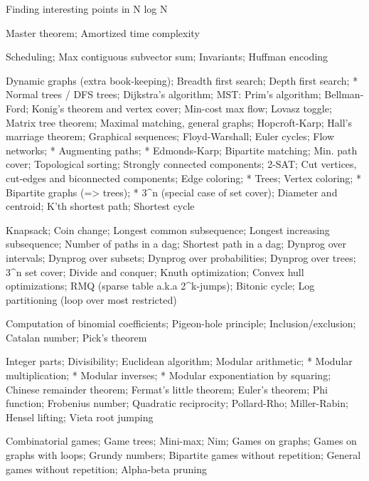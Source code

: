 \begin{multicols}{\Columns}
 \par
{} Finding interesting points in N log N\par
{} Master theorem; Amortized time complexity\par
{} Scheduling; Max contiguous subvector sum; Invariants; Huffman encoding\par
{} Dynamic graphs (extra book-keeping); Breadth first search; Depth first search; * Normal trees / DFS trees; Dijkstra's algorithm; MST: Prim's algorithm; Bellman-Ford; Konig's theorem and vertex cover; Min-cost max flow; Lovasz toggle; Matrix tree theorem; Maximal matching, general graphs; Hopcroft-Karp; Hall's marriage theorem; Graphical sequences; Floyd-Warshall; Euler cycles; Flow networks; * Augmenting paths; * Edmonds-Karp; Bipartite matching; Min. path cover; Topological sorting; Strongly connected components; 2-SAT; Cut vertices, cut-edges and biconnected components; Edge coloring; * Trees; Vertex coloring; * Bipartite graphs (=\textgreater{} trees); * 3\textasciicircum{}n (special case of set cover); Diameter and centroid; K'th shortest path; Shortest cycle\par
{} Knapsack; Coin change; Longest common subsequence; Longest increasing subsequence; Number of paths in a dag; Shortest path in a dag; Dynprog over intervals; Dynprog over subsets; Dynprog over probabilities; Dynprog over trees; 3\textasciicircum{}n set cover; Divide and conquer; Knuth optimization; Convex hull optimizations; RMQ (sparse table a.k.a 2\textasciicircum{}k-jumps); Bitonic cycle; Log partitioning (loop over most restricted)\par
{} Computation of binomial coefficients; Pigeon-hole principle; Inclusion/exclusion; Catalan number; Pick's theorem\par
{} Integer parts; Divisibility; Euclidean algorithm; Modular arithmetic; * Modular multiplication; * Modular inverses; * Modular exponentiation by squaring; Chinese remainder theorem; Fermat's little theorem; Euler's theorem; Phi function; Frobenius number; Quadratic reciprocity; Pollard-Rho; Miller-Rabin; Hensel lifting; Vieta root jumping\par
{} Combinatorial games; Game trees; Mini-max; Nim; Games on graphs; Games on graphs with loops; Grundy numbers; Bipartite games without repetition; General games without repetition; Alpha-beta pruning\par

\end{multicols}

